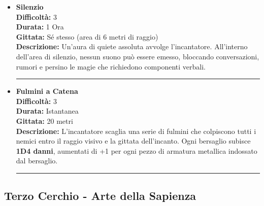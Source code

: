 \documentclass[./magie.tex]{subfiles}
\begin{document}
\begin{itemize}
\item \textbf{Silenzio} \\
\textbf{Difficoltà:} 3 \\
\textbf{Durata:} 1 Ora \\
\textbf{Gittata:} Sé stesso (area di 6 metri di raggio) \\
\textbf{Descrizione:} Un'aura di quiete assoluta avvolge l'incantatore. All'interno dell'area di silenzio, nessun suono può essere emesso, bloccando conversazioni, rumori e persino le magie che richiedono componenti verbali.

\vspace{0.2cm}
\noindent
\begin{center}
\rule{\textwidth}{0.4pt} 
\end{center}
\vspace{0.2cm}

\item \textbf{Fulmini a Catena} \\
\textbf{Difficoltà:} 3 \\
\textbf{Durata:} Istantanea \\
\textbf{Gittata:} 20 metri \\
\textbf{Descrizione:} L'incantatore scaglia una serie di fulmini che colpiscono tutti i nemici entro il raggio visivo e la gittata dell'incanto. Ogni bersaglio subisce \textbf{1D4 danni}, aumentati di +1 per ogni pezzo di armatura metallica indossato dal bersaglio.

\vspace{0.2cm}
\noindent
\begin{center}
\rule{\textwidth}{0.4pt} 
\end{center}
\vspace{0.2cm}

\end{itemize}

\clearpage
 \subsection*{Terzo Cerchio - Arte della Sapienza}
\end{document}
